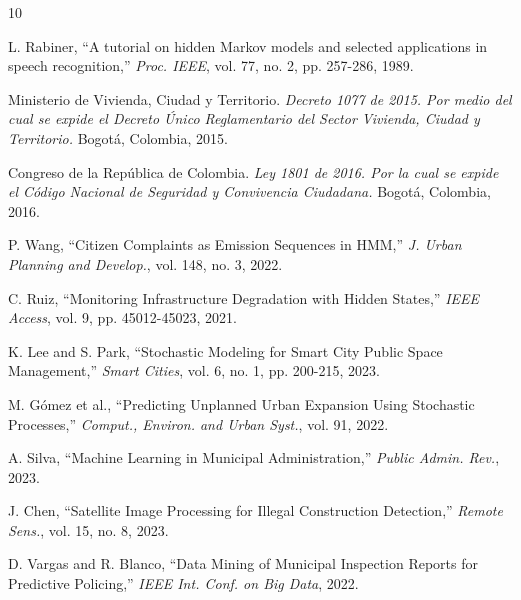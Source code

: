 \documentclass[12pt,letterpaper]{article}
\begin{document}
\begin{thebibliography}{10}

 L. Rabiner, ``A tutorial on hidden Markov models and selected applications in speech recognition,'' \textit{Proc. IEEE}, vol. 77, no. 2, pp. 257-286, 1989.

 Ministerio de Vivienda, Ciudad y Territorio. \textit{Decreto 1077 de 2015. Por medio del cual se expide el Decreto Único Reglamentario del Sector Vivienda, Ciudad y Territorio.} Bogotá, Colombia, 2015.

 Congreso de la República de Colombia. \textit{Ley 1801 de 2016. Por la cual se expide el Código Nacional de Seguridad y Convivencia Ciudadana.} Bogotá, Colombia, 2016.

 P. Wang, ``Citizen Complaints as Emission Sequences in HMM,'' \textit{J. Urban Planning and Develop.}, vol. 148, no. 3, 2022.

 C. Ruiz, ``Monitoring Infrastructure Degradation with Hidden States,'' \textit{IEEE Access}, vol. 9, pp. 45012-45023, 2021.

 K. Lee and S. Park, ``Stochastic Modeling for Smart City Public Space Management,'' \textit{Smart Cities}, vol. 6, no. 1, pp. 200-215, 2023.

 M. Gómez et al., ``Predicting Unplanned Urban Expansion Using Stochastic Processes,'' \textit{Comput., Environ. and Urban Syst.}, vol. 91, 2022.

 A. Silva, ``Machine Learning in Municipal Administration,'' \textit{Public Admin. Rev.}, 2023.

 J. Chen, ``Satellite Image Processing for Illegal Construction Detection,'' \textit{Remote Sens.}, vol. 15, no. 8, 2023.

 D. Vargas and R. Blanco, ``Data Mining of Municipal Inspection Reports for Predictive Policing,'' \textit{IEEE Int. Conf. on Big Data}, 2022.

\end{thebibliography}
\end{document}
